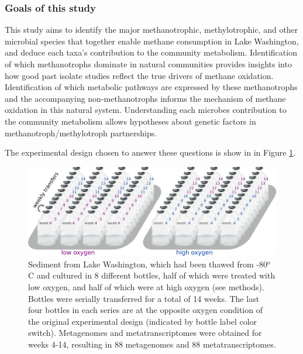 \subsubsection{Goals of this study}
This study aims to identify the major methanotrophic, methylotrophic, and other microbial species that together enable methane consumption in Lake Washington, and deduce each taxa's contribution to the community metabolism.
Identification of which methanotrophs dominate in natural communities provides insights into how good past isolate studies reflect the true drivers of methane oxidation.
Identification of which metabolic pathways are expressed by these methanotrophs and the accompanying non-methanotrophs informs the mechanism of methane oxidation in this natural system.
Understanding each microbes contribution to the community metabolism allows hypotheses about genetic factors in methanotroph/methylotroph partnerships.


The experimental design chosen to answer these questions is show in in Figure \ref{fig:experimental_design}.

\begin{figure}[H]
\centering
     \includegraphics[width=1.0\textwidth]{./tex/chapter2/figures/170311_experimental_design_meta4--2_colors.png}
     \begin{singlespace}
     \caption[Experimental design.]{
        Sediment from Lake Washington, which had been thawed from -80$^o$C and cultured in 8 different bottles,
			half of which were treated with low oxygen, and half of which were at high oxygen (see methods).
		Bottles were serially transferred for a total of 14 weeks.
		The last four bottles in each series are at the opposite oxygen condition of the original experimental design
			(indicated by bottle label color switch).
		Metagenomes and metatranscriptomes were obtained for weeks 4-14, resulting in 88 metagenomes and 88 metatranscriptomes.
		}
     \label{fig:experimental_design}
     \end{singlespace}
\end{figure}

